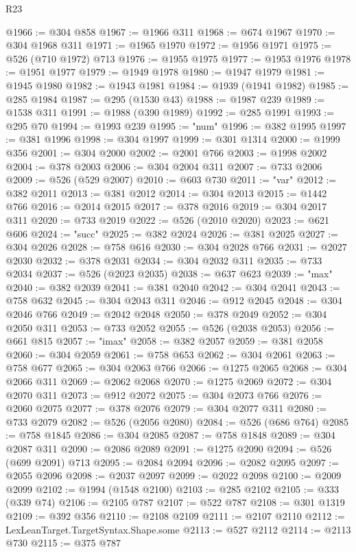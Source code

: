 \begin{lexlean}{R23}
\begin{coremodule}
@1966 := @304 @858
@1967 := @1966 @311
@1968 := @674 @1967
@1970 := @304 @1968 @311
@1971 := @1965 @1970
@1972 := @1956 @1971
@1975 := @526 (@710 @1972) @713
@1976 := @1955 @1975
@1977 := @1953 @1976
@1978 := @1951 @1977
@1979 := @1949 @1978
@1980 := @1947 @1979
@1981 := @1945 @1980
@1982 := @1943 @1981
@1984 := @1939 (@1941 @1982)
@1985 := @285 @1984
@1987 := @295 (@1530 @43)
@1988 := @1987 @239
@1989 := @1538 @311
@1991 := @1988 (@390 @1989)
@1992 := @285 @1991
@1993 := @295 @70
@1994 := @1993 @239
@1995 := "num"
@1996 := @382 @1995
@1997 := @381 @1996
@1998 := @304 @1997
@1999 := @301 @1314
@2000 := @1999 @356
@2001 := @304 @2000
@2002 := @2001 @766
@2003 := @1998 @2002
@2004 := @378 @2003
@2006 := @304 @2004 @311
@2007 := @733 @2006
@2009 := @526 (@529 @2007)
@2010 := @603 @730
@2011 := "var"
@2012 := @382 @2011
@2013 := @381 @2012
@2014 := @304 @2013
@2015 := @1442 @766
@2016 := @2014 @2015
@2017 := @378 @2016
@2019 := @304 @2017 @311
@2020 := @733 @2019
@2022 := @526 (@2010 @2020)
@2023 := @621 @606
@2024 := "succ"
@2025 := @382 @2024
@2026 := @381 @2025
@2027 := @304 @2026
@2028 := @758 @616
@2030 := @304 @2028 @766
@2031 := @2027 @2030
@2032 := @378 @2031
@2034 := @304 @2032 @311
@2035 := @733 @2034
@2037 := @526 (@2023 @2035)
@2038 := @637 @623
@2039 := "max"
@2040 := @382 @2039
@2041 := @381 @2040
@2042 := @304 @2041
@2043 := @758 @632
@2045 := @304 @2043 @311
@2046 := @912 @2045
@2048 := @304 @2046 @766
@2049 := @2042 @2048
@2050 := @378 @2049
@2052 := @304 @2050 @311
@2053 := @733 @2052
@2055 := @526 (@2038 @2053)
@2056 := @661 @815
@2057 := "imax"
@2058 := @382 @2057
@2059 := @381 @2058
@2060 := @304 @2059
@2061 := @758 @653
@2062 := @304 @2061
@2063 := @758 @677
@2065 := @304 @2063 @766
@2066 := @1275 @2065
@2068 := @304 @2066 @311
@2069 := @2062 @2068
@2070 := @1275 @2069
@2072 := @304 @2070 @311
@2073 := @912 @2072
@2075 := @304 @2073 @766
@2076 := @2060 @2075
@2077 := @378 @2076
@2079 := @304 @2077 @311
@2080 := @733 @2079
@2082 := @526 (@2056 @2080)
@2084 := @526 (@686 @764)
@2085 := @758 @1845
@2086 := @304 @2085
@2087 := @758 @1848
@2089 := @304 @2087 @311
@2090 := @2086 @2089
@2091 := @1275 @2090
@2094 := @526 (@699 @2091) @713
@2095 := @2084 @2094
@2096 := @2082 @2095
@2097 := @2055 @2096
@2098 := @2037 @2097
@2099 := @2022 @2098
@2100 := @2009 @2099
@2102 := @1994 (@1548 @2100)
@2103 := @285 @2102
@2105 := @333 (@339 @74)
@2106 := @2105 @787
@2107 := @522 @787
@2108 := @301 @1319
@2109 := @392 @356
@2110 := @2108 @2109
@2111 := @2107 @2110
@2112 := LexLeanTarget.TargetSyntax.Shape.some
@2113 := @527 @2112
@2114 := @2113 @730
@2115 := @375 @787

\end{coremodule}
\end{lexlean}
